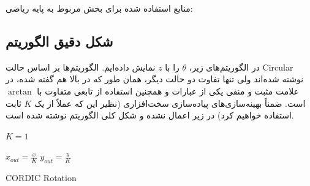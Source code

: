 \documentclass[12pt,titlepage,a4page , tikz , multi,table , svgnames,xcdraw]{article}
\begin{document}
منابع استفاده شده برای بخش مربوط به پایه ریاضی:
\cite{lakshmi} \cite{andraka}     \cite{evaluation}
 
 
\newpage

\subsection{شکل دقیق الگوریتم}

در الگوریتم‌های زیر، $\theta$ را با $z$ نمایش داده‌ایم. الگوریتم‌ها بر اساس حالت Circular نوشته شده‌اند ولی تنها تفاوت دو حالت دیگر، همان طور که در بالا هم گفته شده، در علامت مثبت و منفی یکی از عبارات و همچنین استفاده از تابعی متفاوت با $\arctan$ است. ضمناً بهینه‌سازی‌های پیاده‌سازی سخت‌افزاری (نظیر این که عملاً از یک $K$ ثابت استفاده خواهیم کرد) در زیر اعمال نشده و شکل کلی الگوریتم نوشته شده است. \cite{andraka}

\begin{latin}
\begin{algorithm}[H]
\DontPrintSemicolon
{}

\SetAlgoLined
{}

  $K = 1$\;
  
  $x_{out} = \frac{x}{K}$\;
  $y_{out} = \frac{y}{K}$\;
 
 \caption{CORDIC Rotation}
\end{algorithm}
\end{latin}

\newpage
\end{document}
